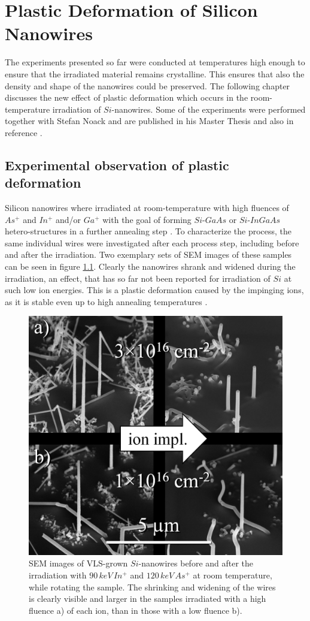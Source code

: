 \chapter{Plastic Deformation of Silicon Nanowires}

The experiments presented so far were conducted at temperatures high enough to ensure that the irradiated material remains crystalline. This ensures that also the density and shape of the nanowires could be preserved. The following chapter discusses the new effect of plastic deformation which occurs in the room-temperature irradiation of $Si$-nanowires. Some of the experiments were performed together with Stefan Noack and are published in his Master Thesis \cite{noack_sputter_2014} and also in reference \cite{johannes_anomalous_2015}.

\section{Experimental observation of plastic deformation}

Silicon nanowires where irradiated at room-temperature with high fluences of $As^+$ and $In^+$ and/or $Ga^+$ with the goal of forming $Si$-$GaAs$ or $Si$-$InGaAs$ hetero-structures in a further annealing step \cite{prucnal_iii-v_2014,glaser_personal_2015}. To characterize the process, the same individual wires were investigated after each process step, including before and after the irradiation. Two exemplary sets of SEM images of these samples can be seen in figure \ref{deformSEM}. Clearly the nanowires shrank and widened during the irradiation, an effect, that has so far not been reported for irradiation of $Si$ at such low ion energies. This is a plastic deformation caused by the impinging ions, as it is stable even up to high annealing temperatures \cite{prucnal_iii-v_2014,glaser_personal_2015}.

\begin{figure}
	\centering
		\includegraphics[width=.45\textwidth]{images/deformSEM.png}
	\caption{SEM images of VLS-grown $Si$-nanowires before and after the irradiation with $90\,keV\, In^+$ and $120\,keV\,As^+$ at room temperature, while rotating the sample. The shrinking and widening of the wires is clearly visible and larger in the samples irradiated with a high fluence a) of each ion, than in those with a low fluence b).} 
	\label{deformSEM}
\end{figure}

